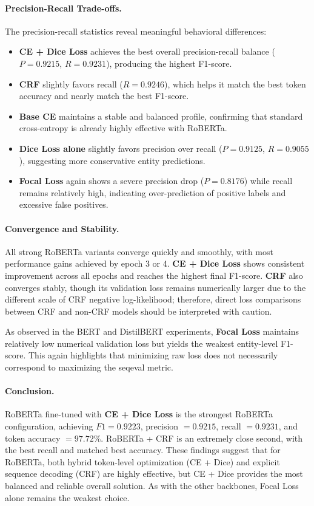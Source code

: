 \paragraph{Precision-Recall Trade-offs.}
The precision-recall statistics reveal meaningful behavioral differences:

\begin{itemize}
\item \textbf{CE + Dice Loss} achieves the best overall precision-recall balance ($P = 0.9215$, $R = 0.9231$), producing the highest F1-score.
\item \textbf{CRF} slightly favors recall ($R = 0.9246$), which helps it match the best token accuracy and nearly match the best F1-score.
\item \textbf{Base CE} maintains a stable and balanced profile, confirming that standard cross-entropy is already highly effective with RoBERTa.
\item \textbf{Dice Loss alone} slightly favors precision over recall ($P = 0.9125$, $R = 0.9055$), suggesting more conservative entity predictions.
\item \textbf{Focal Loss} again shows a severe precision drop ($P = 0.8176$) while recall remains relatively high, indicating over-prediction of positive labels and excessive false positives.
\end{itemize}

\paragraph{Convergence and Stability.}
All strong RoBERTa variants converge quickly and smoothly, with most performance gains achieved by epoch 3 or 4.
\textbf{CE + Dice Loss} shows consistent improvement across all epochs and reaches the highest final F1-score.
\textbf{CRF} also converges stably, though its validation loss remains numerically larger due to the different scale of CRF negative log-likelihood; therefore, direct loss comparisons between CRF and non-CRF models should be interpreted with caution.

As observed in the BERT and DistilBERT experiments, \textbf{Focal Loss} maintains relatively low numerical validation loss but yields the weakest entity-level F1-score.
This again highlights that minimizing raw loss does not necessarily correspond to maximizing the seqeval metric.

\paragraph{Conclusion.}
RoBERTa fine-tuned with \textbf{CE + Dice Loss} is the strongest RoBERTa configuration, achieving $F1 = 0.9223$, precision $= 0.9215$, recall $= 0.9231$, and token accuracy $= 97.72\%$.
RoBERTa + CRF is an extremely close second, with the best recall and matched best accuracy.
These findings suggest that for RoBERTa, both hybrid token-level optimization (CE + Dice) and explicit sequence decoding (CRF) are highly effective, but CE + Dice provides the most balanced and reliable overall solution.
As with the other backbones, Focal Loss alone remains the weakest choice.

